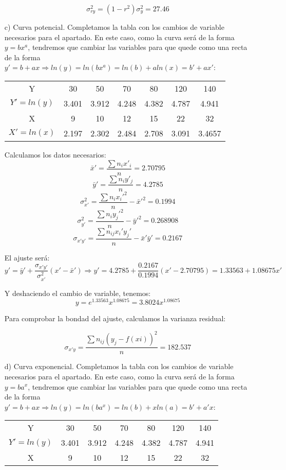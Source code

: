 \documentclass[a4paper,12pt]{article}
\begin{document}
\begin{enumerate}
    $$\sigma_{ry}^2=(1-r^2)\sigma_y^2=27.46$$
    
    \item[c)] Curva potencial.
    Completamos la tabla con los cambios de variable necesarios para el apartado. En este caso, como la curva será de la forma $y=bx^a$, tendremos que cambiar las variables para que quede como una recta de la forma $y'=b+ax \Rightarrow ln(y)=ln(bx^a) = ln(b)+aln(x) = b'+ax'$:
    
    \begin{center}
    \begin{tabular}{c|cccccc}
    Y & 30 & 50 & 70 & 80 & 120 & 140 \\
    $Y'=ln(y)$ & 3.401 & 3.912 & 4.248 & 4.382 & 4.787 & 4.941\\
    \hline
    X & 9 & 10 & 12 & 15 & 22 & 32 \\
    $X'=ln(x)$ & 2.197 & 2.302 & 2.484 & 2.708 & 3.091 & 3.4657\\
    
    \end{tabular}
    \end{center}
    
    Calculamos los datos necesarios:
    $$\bar x'= \frac {\sum n_ix'_i}{n}=2.70795$$
    $$\bar y'= \frac {\sum n_iy'_j}{n}=4.2785$$
    $$\sigma_{x'}^2=\frac {\sum n_ix_i'^2}{n}-\bar x'^2 = 0.1994$$
    $$\sigma_{y'}^2=\frac {\sum n_iy_j'^2}{n}-\bar y'^2 = 0.268908$$
    $$\sigma_{x'y'}=\frac {\sum n_{ij}x_i'y_j'}{n}-\bar x' \bar y' = 0.2167$$

    El ajuste será:
    $$y'= \bar y' + \frac {\sigma_{x'y'}}{\sigma_{x'}^2}(x'-\bar x') \Rightarrow y'=4.2785 + \frac {0.2167}{0.1994}(x'-2.70795) = 1.33563 + 1.08675x'$$
    
    Y deshaciendo el cambio de variable, tenemos:
    $$y=e^{1.33563}x^{1.08675}= 3.8024x^{1.08675}$$
    
    Para comprobar la bondad del ajuste, calculamos la varianza residual:

    $$\sigma_{x'y}=\frac {\sum n_{ij}(y_j-f(xi))^2}{n}= 182.537$$
    
    \item[d)] Curva exponencial.
    Completamos la tabla con los cambios de variable necesarios para el apartado. En este caso, como la curva será de la forma $y=ba^x$, tendremos que cambiar las variables para que quede como una recta de la forma $y'=b+ax \Rightarrow ln(y)=ln(ba^x) = ln(b)+xln(a) = b'+a'x$:
    
    \begin{center}
    \begin{tabular}{c|cccccc}
    Y & 30 & 50 & 70 & 80 & 120 & 140 \\
    $Y'=ln(y)$ & 3.401 & 3.912 & 4.248 & 4.382 & 4.787 & 4.941\\
    \hline
    X & 9 & 10 & 12 & 15 & 22 & 32 \\
    

\end{tabular}
\end{center}
\end{enumerate}
\end{document}
